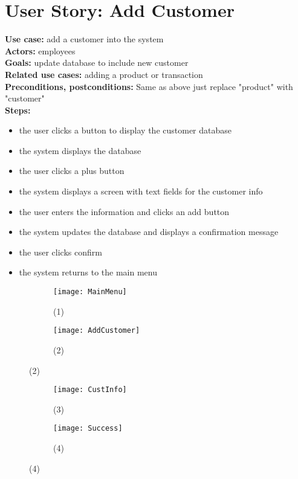 \documentclass[notitlepage,11pt]{article}
\begin{document}
\section{User Story: Add Customer}
	\textbf{Use case:} add a customer into the system\\
	\textbf{Actors:} employees\\
	\textbf{Goals:} update database to include new customer\\
	\textbf{Related use cases:} adding a product or transaction\\
	\textbf{Preconditions, postconditions:} Same as above just replace "product" with "customer"\\
		\textbf{Steps:}
		\begin{itemize}
		\item[(1)] the user clicks a button to display the customer database
		\item[(2)] the system displays the database
		\item the user clicks a plus button 
		\item[(3)] the system displays a screen with text fields for the customer info
		\item the user enters the information and clicks an add button
		\item[(4)] the system updates the database and displays a confirmation message
		\item the user clicks confirm 
		\item[(1)] the system returns to the main menu
		\end{itemize}
\begin{figure}[h]
	\begin{subfigure}{.5\textwidth}
	\centering
	\texttt{[image: MainMenu]}
	\caption{(1)}
	\end{subfigure}%
	\begin{subfigure}{.5\textwidth}
	\centering
	\texttt{[image: AddCustomer]}
	\caption{(2)}
	\end{subfigure}
\end{figure}
\begin{figure}[h]
	\begin{subfigure}{.5\textwidth}
	\centering
	\texttt{[image: CustInfo]}
	\caption{(3)}
	\end{subfigure}%
	\begin{subfigure}{.5\textwidth}
	\centering
	\texttt{[image: Success]}
	\caption{(4)}
	\end{subfigure}
\end{figure}
\end{document}
